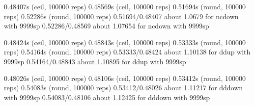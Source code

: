 0.48407s (ceil, 100000 reps)                               0.48569s (ceil, 100000 reps)                              
0.51694s (round, 100000 reps)                              0.52286s (round, 100000 reps)                             
0.51694/0.48407 about 1.0679 for ncdown with 9999sp        0.52286/0.48569 about 1.07654 for ncdown with 9999sp      
                                                                                                                     
0.48424s (ceil, 100000 reps)                               0.48843s (ceil, 100000 reps)                              
0.53333s (round, 100000 reps)                              0.54164s (round, 100000 reps)                             
0.53333/0.48424 about 1.10138 for ddup with 9999sp         0.54164/0.48843 about 1.10895 for ddup with 9999sp        
                                                                                                                     
0.48026s (ceil, 100000 reps)                               0.48106s (ceil, 100000 reps)                              
0.53412s (round, 100000 reps)                              0.54083s (round, 100000 reps)                             
0.53412/0.48026 about 1.11217 for dddown with 9999sp       0.54083/0.48106 about 1.12425 for dddown with 9999sp      
